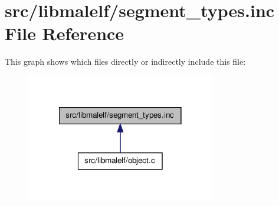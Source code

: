 \hypertarget{segment__types_8inc}{
\section{src/libmalelf/segment\_\-types.inc File Reference}
\label{segment__types_8inc}
}
This graph shows which files directly or indirectly include this file:\nopagebreak
\begin{figure}[H]
\begin{center}
\leavevmode
\includegraphics[width=234pt]{segment__types_8inc__dep__incl}
\end{center}
\end{figure}
